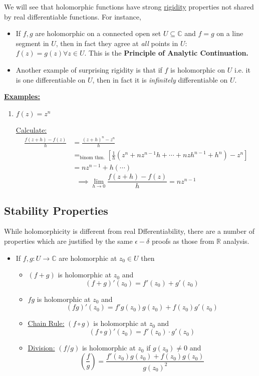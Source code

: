\documentclass{article}
\newcommand{\R}{\mathbb{R}}
\newcommand{\C}{\mathbb{C}}
\begin{document}
\vskip 0.5cm
We will see that holomorphic functions have strong \underline{rigidity} properties not shared by real differentiable functions. For instance,
\begin{itemize}
  \item If $f, g$ are holomorphic on a connected open set $U \subseteq \C$ and $f = g$ on a line segment in $U$, then in fact they agree at \emph{all} points in $U$: $f(z) = g(z) \forall z \in U$. This is the \textbf{Principle of Analytic Continuation.}
  \item Another example of surprising rigidity is that if $f$ is holomorphic on $U$ i.e. it is one differentiable on $U$, then in fact it is \emph{infinitely} differentiable on $U$.
\end{itemize}

\vskip 0.5cm
\underline{\textbf{Examples:}}
\begin{enumerate}
  \item $f(z) = z^n$ 
  
  \vskip 0.5cm
  \underline{Calculate:} 
  \begin{align*}
    \frac{f(z+h)-f(z)}{h} &= \frac{(z+h)^n - z^n}{h} \\
    &=_{\text{binom thm.}} \left[  \frac{1}{h} \left( z^n + nz^{n-1}h + \cdots + nzh^{n-1} + h^n \right) - z^n  \right] \\
    &= nz^{n-1} + h(\cdots)
  \end{align*}
  \[ \implies \lim_{h \rightarrow 0} \frac{f(z + h) - f(z)}{h} = nz^{n-1} \]
\end{enumerate}

\vskip 1cm
\subsection{Stability Properties}
While holomorphicity is different from real Dfferentiability, there are a number of properties which are justified by the same $\epsilon-\delta$ proofs as those from $\R$ analysis.

\begin{itemize}
  \item If $f,g : U \rightarrow \C$ are holomorphic at $z_0 \in U$ then 
  \begin{itemize}
    \item $(f+g)$ is holomorphic at $z_0$ and 
    \[ (f+g)'(z_0) = f'(z_0) + g'(z_0) \]
  
    \item $fg$ is holomorphic at $z_0$ and
    \[ (fg)'(z_0) = f'g(z_0)g(z_0) + f(z_0)g'(z_0) \]
    
    \vskip 0.5cm
    \item \underline{Chain Rule:} $(f \circ g)$ is holomorphic at $z_0$ and 
    \[ (f \circ g)'(z_0) = f'(z_0) \cdot g'(z_0) \]
    
    \vskip 0.5cm
    \item \underline{Division:} $(f/g)$ is holomorphic at $z_0$ if $g(z_0) \neq 0$ and
    \[ \left( \frac{f}{g} \right) = \frac{f'(z_0)g(z_0) + f(z_0)g(z_0)}{g(z_0)^2} \]
  \end{itemize}
\end{itemize}
\end{document}
